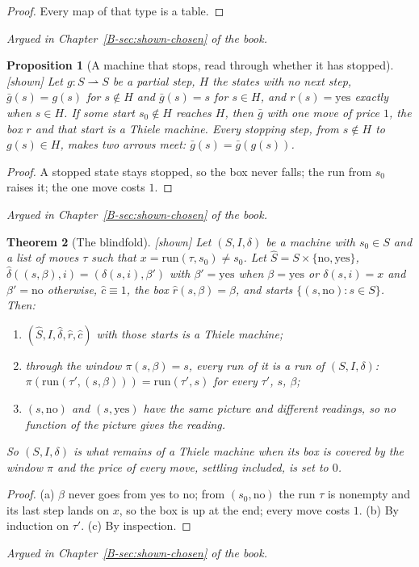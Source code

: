 \documentclass[11pt, a4paper]{article}
\theoremstyle{plain}
\newtheorem{theorem}{Theorem}[section]
\newtheorem{proposition}[theorem]{Proposition}
\theoremstyle{definition}
\theoremstyle{remark}
\newcommand{\Bool}{\{\mathrm{no},\mathrm{yes}\}}
\newcommand{\step}{\delta}
\newcommand{\cost}{c}
\newcommand{\rd}{r}
\newcommand{\run}{\mathrm{run}}
\newcommand{\argued}[1]{\par\noindent\textit{Argued in Chapter~\ref{B-#1} of the book.}\par}
\newcommand{\kind}[1]{\textup{[#1]}}
\begin{document}
\begin{proof}
Every map of that type is a table.
\end{proof}

\argued{sec:shown-chosen}

\begin{proposition}[A machine that stops, read through whether it has stopped]\label{spec:blind-stop}
\kind{shown}
Let $g:S\rightharpoonup S$ be a partial step, $H$ the states with no next step, $\bar g(s)=g(s)$ for $s\notin H$
and $\bar g(s)=s$ for $s\in H$, and $\rd(s)=\mathrm{yes}$ exactly when $s\in H$. If some start $s_0\notin H$
reaches $H$, then $\bar g$ with one move of price $1$, the box $\rd$ and that start is a Thiele machine. Every
stopping step, from $s\notin H$ to $g(s)\in H$, makes two arrows meet: $\bar g(s)=\bar g(g(s))$.
\end{proposition}

\begin{proof}
A stopped state stays stopped, so the box never falls; the run from $s_0$ raises it; the one move costs $1$.
\end{proof}

\argued{sec:shown-chosen}

\begin{theorem}[The blindfold]\label{spec:blindfold} \kind{shown}
Let $(S,I,\step)$ be a machine with $s_0\in S$ and a list of moves $\tau$ such that $x=\run(\tau,s_0)\ne s_0$.
Let $\hat S=S\times\Bool$, $\hat\step((s,\beta),i)=(\step(s,i),\beta')$ with $\beta'=\mathrm{yes}$ when
$\beta=\mathrm{yes}$ or $\step(s,i)=x$ and $\beta'=\mathrm{no}$ otherwise, $\hat\cost\equiv1$,
the box $\hat\rd(s,\beta)=\beta$, and starts $\{(s,\mathrm{no}):s\in S\}$. Then:
\begin{enumerate}[label=(\alph*)]
\item $(\hat S,I,\hat\step,\hat\rd,\hat\cost)$ with those starts is a Thiele machine;
\item through the window $\pi(s,\beta)=s$, every run of it is a run of $(S,I,\step)$:
$\pi(\run(\tau',(s,\beta)))=\run(\tau',s)$ for every $\tau'$, $s$, $\beta$;
\item $(s,\mathrm{no})$ and $(s,\mathrm{yes})$ have the same picture and different readings, so no function of
the picture gives the reading.
\end{enumerate}
So $(S,I,\step)$ is what remains of a Thiele machine when its box is covered by the window $\pi$ and the
price of every move, settling included, is set to $0$.
\end{theorem}

\begin{proof}
(a) $\beta$ never goes from yes to no; from $(s_0,\mathrm{no})$ the run $\tau$ is nonempty and its last step
lands on $x$, so the box is up at the end; every move costs $1$. (b) By induction on $\tau'$. (c) By
inspection.
\end{proof}

\argued{sec:shown-chosen}
\end{document}

